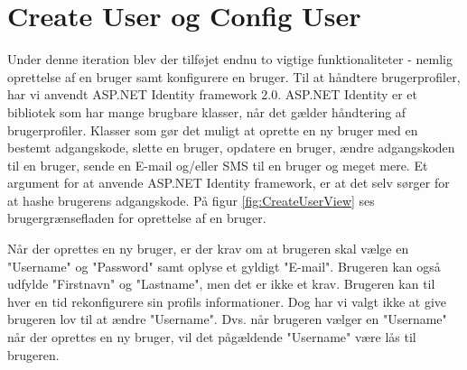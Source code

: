 \section{Create User og Config User}

Under denne iteration blev der tilføjet endnu to vigtige funktionaliteter - nemlig oprettelse af en bruger samt konfigurere en bruger. Til at håndtere brugerprofiler, har vi anvendt ASP.NET Identity framework 2.0. ASP.NET Identity er et bibliotek som har mange brugbare klasser, når det gælder håndtering af brugerprofiler. Klasser som gør det muligt at oprette en ny bruger med en bestemt adgangskode, slette en bruger, opdatere en bruger, ændre adgangskoden til en bruger, sende en E-mail og/eller SMS til en bruger og meget mere. Et argument for at anvende ASP.NET Identity framework, er at det selv sørger for at hashe brugerens adgangskode. 
På figur \ref{fig:CreateUserView} ses brugergrænsefladen for oprettelse af en bruger.


Når der oprettes en ny bruger, er der krav om at brugeren skal vælge en "Username" og "Password" samt oplyse et gyldigt "E-mail". Brugeren kan også udfylde "Firstnavn" og "Lastname", men det er ikke et krav. Brugeren kan til hver en tid rekonfigurere sin profils informationer. Dog har vi valgt ikke at give brugeren lov til at ændre "Username". Dvs. når brugeren vælger en "Username" når der oprettes en ny bruger, vil det pågældende "Username" være lås til brugeren. 
